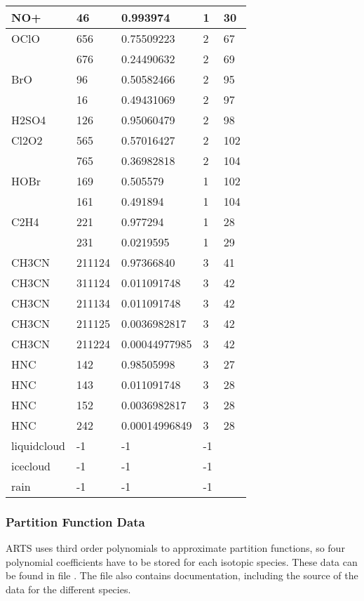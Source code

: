 \begin{longtable}{lllll}
\hline                  
  NO+& 46&  0.993974&  1&30\\
\hline                  
  OClO& 656&  0.75509223&  2&67\\
      & 676&  0.24490632&  2&69\\
\hline                  
  BrO& 96&  0.50582466&  2&95\\
     & 16&  0.49431069&  2&97\\
\hline                  
  H2SO4& 126&  0.95060479&  2&98\\
\hline                  
  Cl2O2& 565&  0.57016427&  2&102\\
       & 765&  0.36982818&  2&104\\
\hline                  
  HOBr& 169&   0.505579  &  1&102\\
      & 161&   0.491894  &  1&104\\
\hline                  
  C2H4& 221&   0.977294  &  1&28\\
      & 231&   0.0219595 &  1&29\\
\hline                  
CH3CN &211124& 0.97366840&  3&41\\
CH3CN &311124& 0.011091748& 3&42\\
CH3CN &211134& 0.011091748& 3&42\\
CH3CN &211125& 0.0036982817&3&42\\
CH3CN &211224& 0.00044977985&3&42\\
\hline                  
  HNC & 142&   0.98505998  &3 &27\\
  HNC & 143&   0.011091748 &3 &28\\
  HNC & 152&   0.0036982817&3 &28\\
  HNC & 242&   0.00014996849&3&28\\
\hline
liquidcloud&          -1 & -1& -1\\
\hline
icecloud&             -1 & -1& -1\\
\hline
rain&                 -1 & -1& -1\\
\end{longtable}


\subsubsection{Partition Function Data}

ARTS uses third order polynomials to approximate partition functions,
so four polynomial coefficients have to be stored for each isotopic
species. These data can be found in file
. The file also contains
documentation, including the source of the data for the different species.

